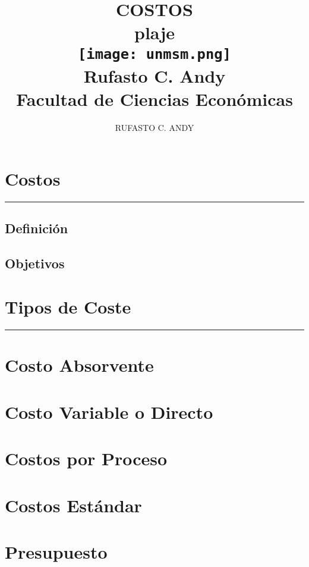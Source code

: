 \documentclass[15pt]{report}
\title{
        {\sc \bf \color{usm} \huge{COSTOS}\\ \LARGE{plaje}}
        \\
      {\texttt{[image: unmsm.png]}}
       \\
        {Rufasto C. Andy}
       \\
        {Facultad de Ciencias Económicas}
       }
\author{RUFASTO C. ANDY}
\date{}
\begin{document}
	\begingroup
	\Large
	\maketitle 
\newpage
	\tableofcontents
\newpage
	\chapter{\color{usm}Costos}
	\maketitle \vskip-25pt \hrule\vskip10pt
\section{Definición}
	
\section{Objetivos}
	
\newpage
	\chapter{\color{usm}Tipos de Coste}
	\maketitle \vskip-25pt \hrule\vskip10pt
	
	\endgroup
	\chapter{\color{usm}Costo Absorvente}
	
	\chapter{\color{usm}Costo Variable o Directo}
	

\newpage
	\chapter{\color{usm}Costos por Proceso}
	
	\flushleft
	\chapter{\color{usm}Costos Estándar}
	
	\chapter{\color{usm}Presupuesto}
	
\end{document}
